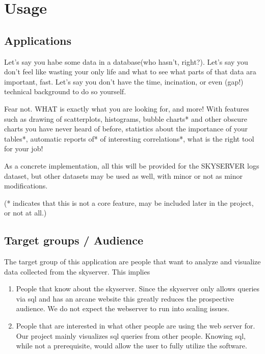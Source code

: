 \section{Usage}

\subsection{Applications}
Let's say you habe some data in a database(who hasn't, right?).
Let's say you don't feel like wasting your only life and what to see what parts of that data ara important, fast.
Let's say you don't have the time, incination, or even (gap!) technical background to do so yourself.

Fear not. WHAT is exactly what you are looking for, and more!
With features such as drawing of scatterplots, histograms, bubble charts* 
and other obscure charts you have never heard of before, statistics about the importance of your tables*,
automatic reports of* of interesting correlations*, what is the right tool for your job!

As a concrete implementation, all this will be provided for the SKYSERVER logs dataset, but other datasets may be
used as well, with minor or not as minor modifications.

(* indicates that this is not a core feature, may be included later in the project, or not at all.)

\subsection{Target groups / Audience}

The target group of this application are people that want to analyze 
and visualize data collected from the skyserver. This implies

\begin{enumerate}
   \item People that know about the skyserver. Since the skyserver only 
   allows queries via sql and has an arcane website this greatly 
   reduces the prospective audience. We do not expect the webserver 
   to run into scaling issues.
  
  \item People that are interested in what other people are 
  using the web server for. Our project mainly visualizes sql queries
   from other people. Knowing sql, while not a prerequisite, 
   would allow the user to fully utilize the software.
  
\end{enumerate}

